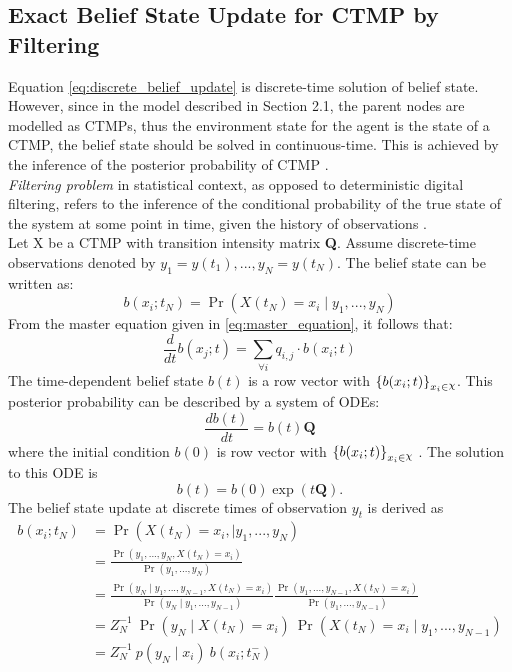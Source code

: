 \subsection{Exact Belief State Update for CTMP by Filtering}
\label{sec:filtering_CTMC}
Equation \ref{eq:discrete_belief_update} is discrete-time solution of belief state. However, since in the model described in Section 2.1, the parent nodes are modelled as CTMPs, thus the environment state for the agent is the state of a CTMP, the belief state should be solved in continuous-time. This is achieved by the inference of the posterior probability of CTMP \cite{article}.\\
\textit{Filtering problem} in statistical context, as opposed to deterministic digital filtering, refers to the inference of the conditional probability of the true state of the system at some point in time, given the history of observations \cite{Godsill2019}.\\
Let X be a CTMP with transition intensity matrix \textbf{Q}. Assume discrete-time observations denoted by $ y_{1}=y(t_{1}), ..., y_{N}=y(t_{N}) $. The belief state can be written as:
\begin{equation}
b(x_{i};t_{N}) = \operatorname{Pr}(X(t_{N}) = x_{i} \mid y_{1}, ..., y_{N})
\end{equation}
From the master equation given in \autoref{eq:master_equation}, it follows that:
\begin{equation}
\frac{d}{dt} b(x_{j};t)  = \sum_{\forall i} q_{i,j} \cdot b(x_{i};t)
\end{equation}
The time-dependent belief state $ b(t) $ is a row vector with $ \left\lbrace b(x_{i};t)\right\rbrace_{x_{i} \in \rchi}  $.
This posterior probability can be described by a system of ODEs:
\begin{equation}
\frac{db(t)}{dt} = b(t)\textbf{Q}
\end{equation}
where the initial condition $ b(0) $ is row vector with $ \left\lbrace b(x_{i};t)\right\rbrace_{x_{i} \in \rchi} $ \cite{article}. The solution to this ODE is
\begin{equation}
b(t) = b(0) \exp(t\textbf{Q}).
\label{eq:b_cont}
\end{equation}
The belief state update at discrete times of observation $ y_{t} $ is derived as 
\begin{align}
b(x_{i}; t_{N}) & = \operatorname{Pr}( X(t_{N}) = x_{i},\mid y_{1}, ..., y_{N}) \nonumber\\ & = \frac{\operatorname{Pr}(y_{1}, ..., y_{N}, X(t_{N}) = x_{i})}{\operatorname{Pr}(y_{1}, ..., y_{N})}  \nonumber\\ & = \frac{\operatorname{Pr}(y_{N} \mid y_{1}, ..., y_{N-1}, X(t_{N}) = x_{i})}{\operatorname{Pr}(y_{N} \mid y_{1}, ..., y_{N-1})} \frac{\operatorname{Pr}(y_{1}, ..., y_{N-1}, X(t_{N}) = x_{i})}{\operatorname{Pr}(y_{1}, ..., y_{N-1})}  \nonumber\\ & = Z_{N}^{-1} \ \operatorname{Pr}(y_{N} \mid X(t_{N})=x_{i})\ \operatorname{Pr}( X(t_{N}) = x_{i}\mid y_{1}, ..., y_{N-1})  \nonumber\\ & = Z_{N}^{-1}\ {p(y_{N} \mid x_{i})}\ {b(x_{i}; t_{N}^{-})}
\label{eq:b_jump}
\end{align}
